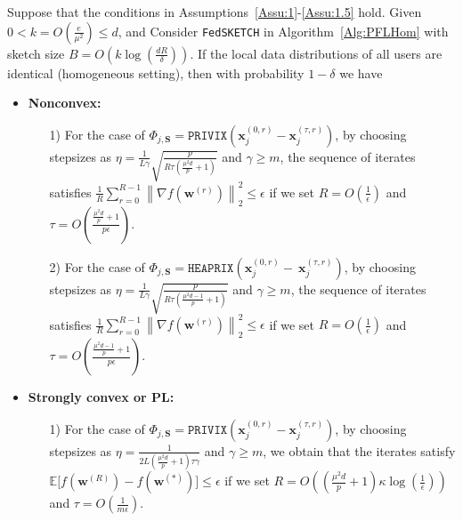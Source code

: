 \begin{theorem}\label{thm:homog_case}
  Suppose that the conditions in Assumptions~\ref{Assu:1}-\ref{Assu:1.5} hold. Given $0<k=O\left(\frac{e}{\mu^2}\right)\leq d$, and Consider \texttt{FedSKETCH} in Algorithm~\ref{Alg:PFLHom} with sketch size $B=O\left(k\log\left(\frac{d R}{\delta}\right)\right)$. If the local data distributions of all users are identical (homogeneous setting), then with probability $1-\delta$ we have  
 \begin{itemize}
     \item \textbf{Nonconvex:}  
     \begin{itemize}
         \item [1)] For the case of $\Phi_{j,\mathbf{S}}=\texttt{PRIVIX}\left(\boldsymbol{x}_j^{(0,r)}-\boldsymbol{x}_j^{(\tau,r)}\right)$, by choosing stepsizes as $\eta=\frac{1}{L\gamma}\sqrt{\frac{p}{R\tau\left(\frac{\mu^2d}{p}+1\right)}}$ and $\gamma\geq m$, the sequence of iterates satisfies  $\frac{1}{R}\sum_{r=0}^{R-1}\left\|\nabla f({\boldsymbol{w}}^{(r)})\right\|_2^2\leq {\epsilon}$ if we set
     $R=O\left(\frac{1}{\epsilon}\right)$ and $ \tau=O\left(\frac{\frac{\mu^2d}{p}+1}{{p}\epsilon}\right)$.
         \item[2)] For the case of 
$  \Phi_{j,\mathbf{S}}=\texttt{HEAPRIX}\left(\boldsymbol{x}_j^{(0,r)}-~{\boldsymbol{x}}_{j}^{(\tau,r)}\right)$, by choosing stepsizes as $\eta=\frac{1}{L\gamma}\sqrt{\frac{p}{R\tau\left(\frac{\mu^2d-1}{p}+1\right)}}$ and $\gamma\geq m$, the sequence of iterates satisfies  $\frac{1}{R}\sum_{r=0}^{R-1}\left\|\nabla f({\boldsymbol{w}}^{(r)})\right\|_2^2\leq {\epsilon}$ if we set
     $R=O\left(\frac{1}{\epsilon}\right)$ and $ \tau=O\left(\frac{\frac{\mu^2d-1}{p}+1}{{p}\epsilon}\right)$. 
     \end{itemize}
     
     \item \textbf{Strongly convex or PL:}
      \begin{itemize}
          \item[1)] For the case of $\Phi_{j,\mathbf{S}}=\texttt{PRIVIX}\left(\boldsymbol{x}_j^{(0,r)}-\boldsymbol{x}_j^{(\tau,r)}\right)$, by choosing stepsizes as $\eta=\frac{1}{2L\left(\frac{\mu^2d}{p}+1\right)\tau\gamma}$ and $\gamma\geq m$, we obtain that the iterates satisfy $\mathbb{E}\Big[f({\boldsymbol{w}}^{(R)})-f({\boldsymbol{w}}^{(*)})\Big]\leq \epsilon$ if  we set
     $R=O\left(\left(\frac{\mu^2d}{p}+1\right)\kappa\log\left(\frac{1}{\epsilon}\right)\right)$ and $ \tau=O\left(\frac{1}{m\epsilon}\right)$.
          

\end{itemize}
\end{itemize}
\end{theorem}
